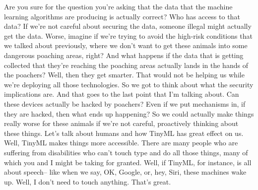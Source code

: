Are you sure for the question you're asking that the data that the machine learning algorithms are producing is actually correct?
Who has access to that data?
If we're not careful about securing the data, someone illegal might actually get the data.
Worse, imagine if we're trying to avoid the high-risk conditions that we talked about previously, where we don't want to get these animals into some dangerous poaching areas, right?
And what happens if the data that is getting collected that they're reaching the poaching areas actually lands in the hands of the poachers?
Well, then they get smarter.
That would not be helping us while we're deploying all those technologies.
So we got to think about what the security implications are.
And that goes to the last point that I'm talking about.
Can these devices actually be hacked by poachers?
Even if we put mechanisms in, if they are hacked, then what ends up happening?
So we could actually make things really worse for these animals if we're not careful, proactively thinking about these things.
Let's talk about humans and how TinyML has great effect on us.
Well, TinyML makes things more accessible.
There are many people who are suffering from disabilities who can't touch type and do all those things, many of which you and I might be taking for granted.
Well, if TinyML, for instance, is all about speech-- like when we say, OK, Google, or, hey, Siri, these machines wake up.
Well, I don't need to touch anything.
That's great.


